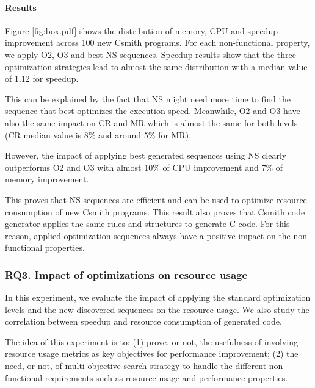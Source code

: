 \paragraph{Results}
Figure \ref{fig:box.pdf} shows the distribution of memory, CPU and speedup improvement across 100 new Csmith programs. For each non-functional property, we apply O2, O3 and best NS sequences. Speedup results show that the three optimization strategies lead to almost the same distribution with a median value of 1.12 for speedup. 

This can be explained by the fact that NS might need more time to find the sequence that best optimizes the execution speed. Meanwhile, O2 and O3 have also the same impact on CR and MR which is almost the same for both levels (CR median value is 8\% and around 5\% for MR).

However, the impact of applying best generated sequences using NS clearly outperforms O2 and O3 with almost 10\% of CPU improvement and 7\% of memory improvement. 

This proves that NS sequences are efficient and can be used to optimize resource consumption of new Csmith programs. This result also proves that Csmith code generator applies the same rules and structures to generate C code. For this reason, applied optimization sequences always have a positive impact on the non-functional properties.

\noindent{}


\subsubsection{RQ3. Impact of optimizations on resource usage}
In this experiment, we evaluate the impact of applying the standard optimization levels and the new discovered sequences on the resource usage. We also study the correlation between speedup and resource consumption of generated code. 

The idea of this experiment is to: (1) prove, or not, the usefulness of involving resource usage metrics as key objectives for performance improvement; (2) the need, or not, of multi-objective search strategy to handle the different non-functional requirements such as resource usage and performance properties.


